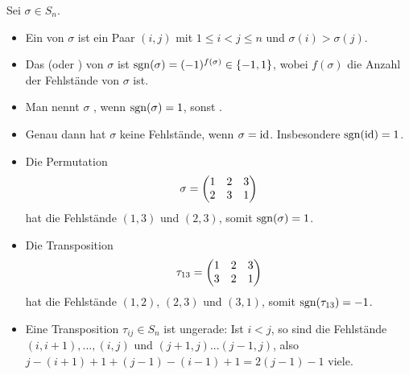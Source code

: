 \begin{definition}
	Sei $\sigma\in S_n$.
	\begin{itemize}
		\item Ein  von $\sigma$ ist ein Paar $(i,j)$ mit $1\le i<j\le n$ und $\sigma(i)>\sigma(j)$.
		\item Das  (oder ) von $\sigma$ ist $\operatorname{sgn}(\sigma)=(-1)^{f(\sigma)}\in \{-1,1\}$, wobei $f(\sigma)$ die 
		Anzahl der Fehlstände von $\sigma$ ist.
		\item Man nennt $\sigma$ , wenn $\operatorname{sgn}(\sigma)=1$, sonst .
	\end{itemize}
\end{definition}

\begin{example}
	\begin{itemize}
		\item Genau dann hat $\sigma$ keine Fehlstände, wenn $\sigma=\operatorname{id}$. Insbesondere $\operatorname{sgn}(\operatorname{id})=1$.
		\item Die Permutation 
		\begin{align}
			\sigma=\begin{pmatrix}1 & 2 & 3\\2 & 3 & 1\\\end{pmatrix}\notag
		\end{align} hat die Fehlstände $(1,3)$ und $(2,3)$, somit 
		$\operatorname{sgn}(\sigma)=1$.
		\item Die Transposition 
		\begin{align}
			\tau_{13}=\begin{pmatrix}1 & 2 & 3\\3 & 2 & 1\\\end{pmatrix}\notag
		\end{align} hat die Fehlstände $(1,2)$, $(2,3)$ und 
		$(3,1)$, somit $\operatorname{sgn}(\tau_{13})=-1$.
		\item Eine Transposition $\tau_{ij}\in S_n$ ist ungerade: Ist $i<j$, so sind die Fehlstände $(i,i+1),...,(i,j)$ und $(j+1,j)...
		(j-1,j)$, also $j-(i+1)+1+(j-1)-(i-1)+1=2(j-1)-1$ viele.
	\end{itemize}
\end{example}

